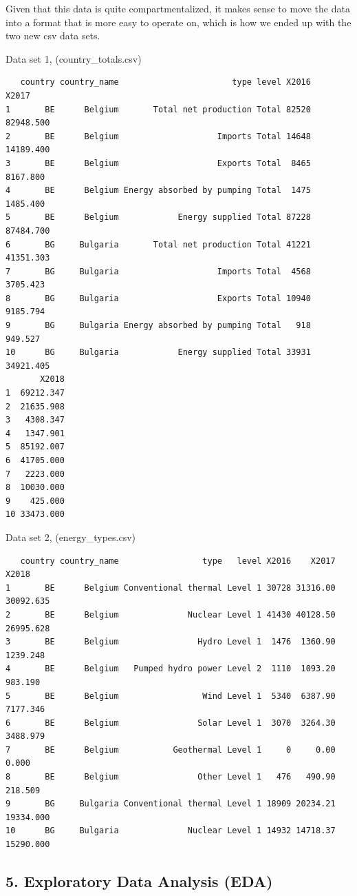 \documentclass[
  letterpaper,
  DIV=11,
  numbers=noendperiod]{scrartcl}
\begin{document}
Given that this data is quite compartmentalized, it makes sense to move
the data into a format that is more easy to operate on, which is how we
ended up with the two new csv data sets.

Data set 1, (country\_totals.csv)

\begin{verbatim}
   country country_name                       type level X2016     X2017
1       BE      Belgium       Total net production Total 82520 82948.500
2       BE      Belgium                    Imports Total 14648 14189.400
3       BE      Belgium                    Exports Total  8465  8167.800
4       BE      Belgium Energy absorbed by pumping Total  1475  1485.400
5       BE      Belgium            Energy supplied Total 87228 87484.700
6       BG     Bulgaria       Total net production Total 41221 41351.303
7       BG     Bulgaria                    Imports Total  4568  3705.423
8       BG     Bulgaria                    Exports Total 10940  9185.794
9       BG     Bulgaria Energy absorbed by pumping Total   918   949.527
10      BG     Bulgaria            Energy supplied Total 33931 34921.405
       X2018
1  69212.347
2  21635.908
3   4308.347
4   1347.901
5  85192.007
6  41705.000
7   2223.000
8  10030.000
9    425.000
10 33473.000
\end{verbatim}

Data set 2, (energy\_types.csv)

\begin{verbatim}
   country country_name                 type   level X2016    X2017     X2018
1       BE      Belgium Conventional thermal Level 1 30728 31316.00 30092.635
2       BE      Belgium              Nuclear Level 1 41430 40128.50 26995.628
3       BE      Belgium                Hydro Level 1  1476  1360.90  1239.248
4       BE      Belgium   Pumped hydro power Level 2  1110  1093.20   983.190
5       BE      Belgium                 Wind Level 1  5340  6387.90  7177.346
6       BE      Belgium                Solar Level 1  3070  3264.30  3488.979
7       BE      Belgium           Geothermal Level 1     0     0.00     0.000
8       BE      Belgium                Other Level 1   476   490.90   218.509
9       BG     Bulgaria Conventional thermal Level 1 18909 20234.21 19334.000
10      BG     Bulgaria              Nuclear Level 1 14932 14718.37 15290.000
\end{verbatim}

\subsection{5. Exploratory Data Analysis
(EDA)~}\label{exploratory-data-analysis-eda}
\end{document}
